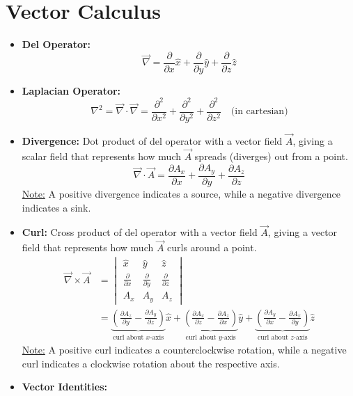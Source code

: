 \documentclass[12pt]{article}
\begin{document}
\section*{Vector Calculus}
\begin{itemize}
       \item \textbf{Del Operator:}
       \[\vec{\nabla} = \frac{\partial}{\partial x}\hat{x} + \frac{\partial}{\partial y}\hat{y} + \frac{\partial}{\partial z}\hat{z}\]
       \item \textbf{Laplacian Operator:} 
       \[\nabla^2 = \vec{\nabla} \cdot \vec{\nabla} = \frac{\partial^2}{\partial x^2} + \frac{\partial^2}{\partial y^2} + \frac{\partial^2}{\partial z^2} \quad \text{(in cartesian)}\]
       \item \textbf{Divergence:} Dot product of del operator with a vector field $\vec{A}$, giving a scalar field that represents how much $\vec{A}$ spreads (diverges) out from a point.
       \[\vec{\nabla} \cdot \vec{A} = \frac{\partial A_x}{\partial x} + \frac{\partial A_y}{\partial y} + \frac{\partial A_z}{\partial z}\]
       \underline{Note:} A positive divergence indicates a source, while a negative divergence indicates a sink.
       \item \textbf{Curl:} Cross product of del operator with a vector field $\vec{A}$, giving a vector field that represents how much $\vec{A}$ curls around a point.
\begin{align*}
\vec{\nabla} \times \vec{A}
&=
\begin{vmatrix}
\hat{x} & \hat{y} & \hat{z} \\
\frac{\partial}{\partial x} &
\frac{\partial}{\partial y} &
\frac{\partial}{\partial z} \\
A_x & A_y & A_z
\end{vmatrix} \\
&=
\underbrace{\left( \frac{\partial A_z}{\partial y}
- \frac{\partial A_y}{\partial z} \right)}_{\text{curl about }x\text{-axis}} \hat{x}
+
\underbrace{\left( \frac{\partial A_x}{\partial z}
- \frac{\partial A_z}{\partial x} \right)}_{\text{curl about }y\text{-axis}} \hat{y}
+
\underbrace{\left( \frac{\partial A_y}{\partial x}
- \frac{\partial A_x}{\partial y} \right)}_{\text{curl about }z\text{-axis}} \hat{z}
\end{align*}
\underline{Note:} A positive curl indicates a counterclockwise rotation, while a negative curl indicates a clockwise rotation about the respective axis.
\item \textbf{Vector Identities:} \\

\end{itemize}
\end{document}
